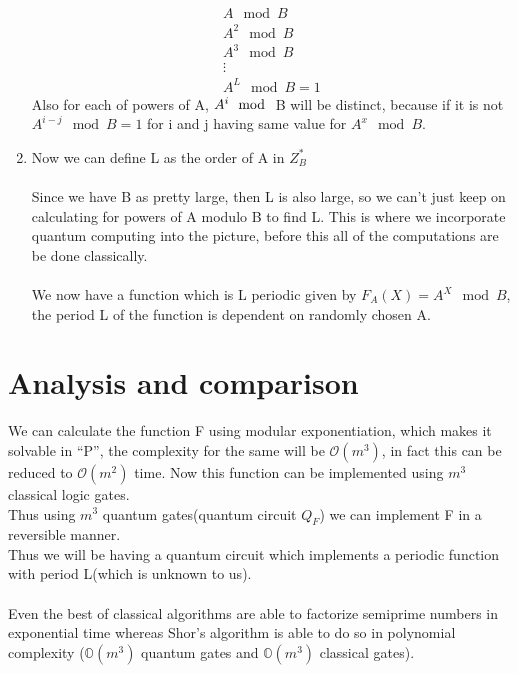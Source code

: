 \begin{enumerate}
\begin{equation*}
        \begin{matrix}
            A \mod B \\
            A^2 \mod B \\
            A^3 \mod B \\
            \vdots \\
            A^L \mod B = 1
        \end{matrix}
    \end{equation*}
    Also for each of powers of A, $A^i \mod$ B will be distinct, because if it is not $A^{i-j} \mod B = 1$ for i and j having same value for $A^x \mod B$.
    \item Now we can define L as the order of A in $Z_B^*$ \\ \\
     Since we have B as pretty large, then L is also large, so we can't just keep on calculating for powers of A modulo B to find L. This is where we incorporate quantum computing into the picture, before this all of the computations are be done classically. \\ \\
     We now have a function which is L periodic given by $F_A(X) = A^X \mod B$, the period L of the function is dependent on randomly chosen A. 
    
     
\end{enumerate}
\section{Analysis and comparison}
We can calculate the function F using modular exponentiation, which makes it solvable in ``P'', the complexity for the same will be $\mathcal{O}(m^3)$, in fact this can be reduced to $\mathcal{O}(m^2)$ time. Now this function can be implemented using $m^3$ classical logic gates.\\
Thus using $m^3$ quantum gates(quantum circuit $Q_F$) we can implement F in a reversible manner. \\
Thus we will be having a quantum circuit which implements a periodic function with period L(which is unknown to us).\\
\\
Even the best of classical algorithms are able to factorize semiprime numbers in exponential time whereas Shor's algorithm is able to do so in polynomial complexity ($\mathbb{O}(m^3)$ quantum gates and $\mathbb{O}(m^3)$ classical gates).